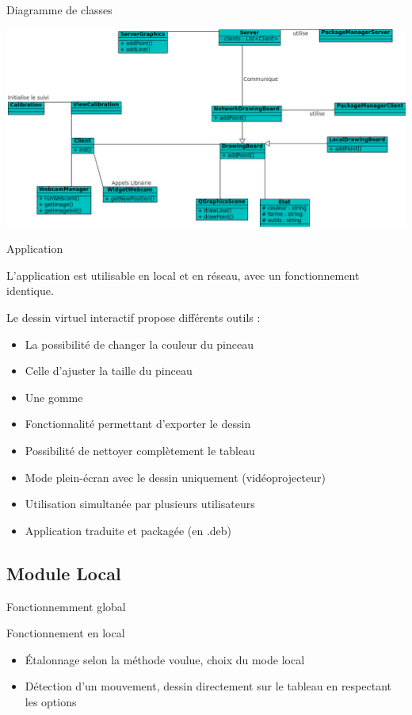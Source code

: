 \documentclass{beamer}
\begin{document}
		\begin{frame}{Diagramme de classes}
			\begin{center}		
			\includegraphics[scale=0.45]{../uml/classes.png}
			\end{center}
		\end{frame}
		
		\begin{frame}{Application}
			
			L'application est utilisable en local et en réseau, avec un fonctionnement identique.
			
			Le dessin virtuel interactif propose différents outils :
			\begin{itemize}
			\item La possibilité de changer la couleur du pinceau
      \item Celle d'ajuster la taille du pinceau
			\item Une gomme
			\item Fonctionnalité permettant d'exporter le dessin
			\item Possibilité de nettoyer complètement le tableau
			\item Mode plein-écran avec le dessin uniquement (vidéoprojecteur)
			\item Utilisation simultanée par plusieurs utilisateurs
			\item Application traduite et packagée (en .deb)
			\end{itemize}
		\end{frame}
		
	\subsection{Module Local}
		\begin{frame}{Fonctionnemment global}
			\begin{block}{Fonctionnement en local}
				\begin{itemize}
				\item Étalonnage selon la méthode voulue, choix du mode local
				\item Détection d'un mouvement, dessin directement sur le tableau en respectant les options
				\end{itemize}
			\end{block}
		\end{frame}
		
\end{document}
